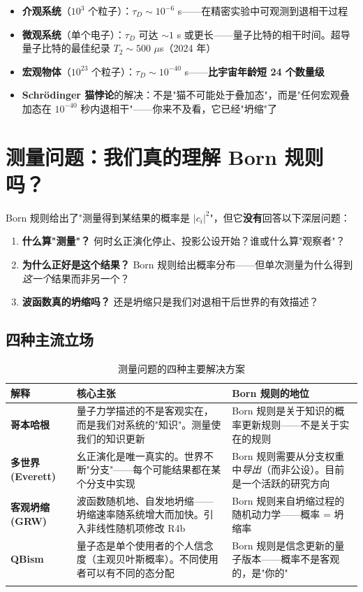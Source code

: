 \begin{oombox}[退相干时间的数量级比较]
  \begin{itemize}
    \item \textbf{介观系统}（$10^3$ 个粒子）：$\tau_D \sim 10^{-6}$ s——在精密实验中可观测到退相干过程
    \item \textbf{微观系统}（单个电子）：$\tau_D$ 可达 $\sim 1$ s 或更长——量子比特的相干时间。超导量子比特的最佳纪录 $T_2 \sim 500$ $\mu$s（2024 年）
    \item \textbf{宏观物体}（$10^{23}$ 个粒子）：$\tau_D \sim 10^{-40}$ s——\textbf{比宇宙年龄短 24 个数量级}
    \item \textbf{Schr\"odinger 猫悖论}的解决：不是"猫不可能处于叠加态"，而是"任何宏观叠加态在 $10^{-40}$ 秒内退相干"——你来不及看，它已经"坍缩"了
  \end{itemize}
\end{oombox}

\section{测量问题：我们真的理解 Born 规则吗？}

Born 规则给出了"测量得到某结果的概率是 $|c_i|^2$"，但它\textbf{没有}回答以下深层问题：

\begin{enumerate}
  \item \textbf{什么算"测量"？} 何时幺正演化停止、投影公设开始？谁或什么算"观察者"？
  \item \textbf{为什么正好是这个结果？} Born 规则给出概率分布——但单次测量为什么得到\textit{这一个}结果而非另一个？
  \item \textbf{波函数真的坍缩吗？} 还是坍缩只是我们对退相干后世界的有效描述？
\end{enumerate}

\subsection{四种主流立场}

\begin{center}
\footnotesize
\begin{longtable}{p{3cm}p{5.5cm}p{5cm}}
\toprule
\textbf{解释} & \textbf{核心主张} & \textbf{Born 规则的地位} \\
\midrule
\textbf{哥本哈根} & 量子力学描述的不是客观实在，而是我们对系统的"知识"。测量使我们的知识更新 & Born 规则是关于知识的概率更新规则——不是关于实在的规则 \\
\textbf{多世界 (Everett)} & 幺正演化是唯一真实的。世界不断"分支"——每个可能结果都在某个分支中实现 & Born 规则需要从分支权重中\emph{导出}（而非公设）。目前是一个活跃的研究方向 \\
\textbf{客观坍缩 (GRW)} & 波函数随机地、自发地坍缩——坍缩速率随系统增大而加快。引入非线性随机项修改 R4b & Born 规则来自坍缩过程的随机动力学——概率 = 坍缩率 \\
\textbf{QBism} & 量子态是单个使用者的个人信念度（主观贝叶斯概率）。不同使用者可以有不同的态分配 & Born 规则是信念更新的量子版本——概率不是客观的，是"你的" \\
\bottomrule
\caption{测量问题的四种主要解决方案}
\end{longtable}
\end{center}

